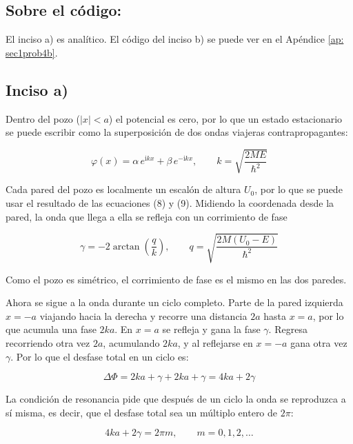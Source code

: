 \subsection*{Sobre el código:}

El inciso a) es analítico. El código del inciso b) se puede ver en el Apéndice \ref{ap: sec1prob4b}.

\subsection*{Inciso a)}

Dentro del pozo ($|x|<a$) el potencial es cero, por lo que un estado estacionario se puede escribir como la superposición de dos ondas viajeras contrapropagantes:

\begin{equation}
    \varphi(x) = \alpha\,e^{\mathrm{i}kx} + \beta\,e^{-\mathrm{i}kx}, \qquad k=\sqrt{\frac{2ME}{\hbar^2}}
\end{equation}

Cada pared del pozo es localmente un escalón de altura $U_0$, por lo que se puede usar el resultado de las ecuaciones (8) y (9). Midiendo la coordenada desde la pared, la onda que llega a ella se refleja con un corrimiento de fase

\begin{equation}
    \gamma = -2\arctan\left(\frac{q}{k}\right), \qquad q=\sqrt{\frac{2M(U_0-E)}{\hbar^2}}
    \label{eq: gamma}
\end{equation}

Como el pozo es simétrico, el corrimiento de fase es el mismo en las dos paredes.

Ahora se sigue a la onda durante un ciclo completo. Parte de la pared izquierda $x=-a$ viajando hacia la derecha y recorre una distancia $2a$ hasta $x=a$, por lo que acumula una fase $2ka$. En $x=a$ se refleja y gana la fase $\gamma$. Regresa recorriendo otra vez $2a$, acumulando $2ka$, y al reflejarse en $x=-a$ gana otra vez $\gamma$. Por lo que el desfase total en un ciclo es:

\begin{equation}
    \Delta\Phi = 2ka + \gamma + 2ka + \gamma = 4ka + 2\gamma
\end{equation}

La condición de resonancia pide que después de un ciclo la onda se reproduzca a sí misma, es decir, que el desfase total sea un múltiplo entero de $2\pi$:

\begin{equation}
    4ka + 2\gamma = 2\pi m, \qquad m=0,1,2,\ldots
\end{equation}

